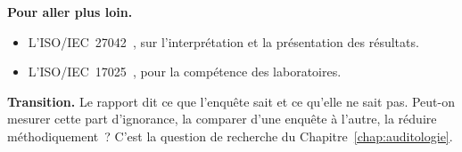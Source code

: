 \bigskip

\begin{boxinfo}
\textbf{Pour aller plus loin.}
\begin{itemize}
    \item L'ISO/IEC~27042~\cite{iso27042_2015}, sur l'interprétation et la
          présentation des résultats.
    \item L'ISO/IEC~17025~\cite{iso17025_2017}, pour la compétence des
          laboratoires.
\end{itemize}
\end{boxinfo}

\begin{boxinfo}
\textbf{Transition.} Le rapport dit ce que l'enquête sait et ce qu'elle ne
sait pas. Peut-on mesurer cette part d'ignorance, la comparer d'une enquête
à l'autre, la réduire méthodiquement~? C'est la question de recherche du
Chapitre~\ref{chap:auditologie}.
\end{boxinfo}
